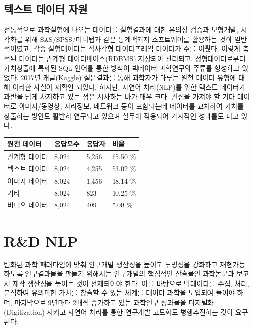 \documentclass[smallextended]{svjour3}       %
\begin{document}
\hypertarget{uxd14duxc2a4uxd2b8-uxb370uxc774uxd130-uxc790uxc6d0}{%
\subsection{텍스트 데이터
자원}\label{uxd14duxc2a4uxd2b8-uxb370uxc774uxd130-uxc790uxc6d0}}

전통적으로 과학실험에 나오는 데이터를 실험결과에 대한 유의성 검증과
모형개발, 시각화를 위해 SAS/SPSS/미니탭과 같은 통계팩키지 소프트웨어를
활용하는 것이 일반적이였고, 각종 실험데이터는 직사각형 데이터프레임
데이터가 주를 이뤘다. 이렇게 축적된 데이터는 관계형 데이터베이스(RDBMS)
저장되어 관리되고, 정형데이터로부터 가치창출에 특화된 SQL 언어를 통한
방식이 빅데이터 과학연구의 주류를 형성하고 있었다. 2017년 캐글(Kaggle)
설문결과를 통해 과학자가 다루는 원천 데이터 유형에 대해 이러한 사실이
재확인 되었다. 하지만, 자연어 처리(NLP)를 위한 텍스트 데이터가 과반을
넘게 차지하고 있는 점은 시사하는 바가 매우 크다. 관심을 가져야 할 기타
데이터로 이미지/동영상, 지리정보, 네트워크 등이 포함되는데 데이터를
교차하여 가치를 창출하는 방안도 활발히 연구되고 있으며 실무에 적용되어
가시적인 성과를도 내고 있다.

\begin{table}
    \centering
    \begin{tabular}{|l|l|l|l|}
    \hline
        원천 데이터 & 응답모수 & 응답자 & 비율 \\ \hline
        관계형 데이터 & 8,024 & 5,256 & 65.50 \% \\ \hline
        텍스트 데이터 & 8,024 & 4,255 & 53.02 \% \\ \hline
        이미지 데이터 & 8,024 & 1,456 & 18.14 \% \\ \hline
        기타 & 8,024 & 823 & 10.25 \% \\ \hline
        비디오 데이터 & 8,024 & 409 & 5.09 \% \\ \hline
    \end{tabular}
\end{table}

\hypertarget{rd-nlp}{%
\section{R\&D NLP}\label{rd-nlp}}

변화된 과학 패러다임에 맞춰 연구개발 생산성을 높이고 투명성을 강화하고
재현가능하도록 연구결과물을 만들기 위해서는 연구개발의 핵심적인 산출물인
과학논문과 보고서 제작 생산성을 높이는 것이 전제되어야 한다. 이를
바탕으로 빅데이터를 수집, 처리, 분석하여 유의미한 가치를 창출할 수 있는
체계를 데이터 과학을 도입되여 풀어야 하며, 마지막으로 9년마다 2배씩
증가하고 있는 과학연구 성과물을 디지털화(Digitization) 시키고 자연어
처리를 통한 연구개발 고도화도 병행추진하는 것이 요구된다.
\end{document}
